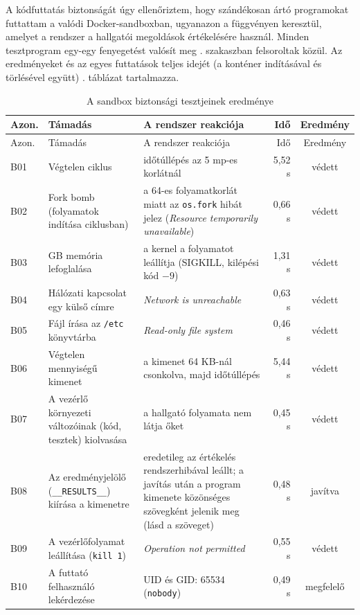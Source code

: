 A kódfuttatás biztonságát úgy ellenőriztem, hogy szándékosan ártó programokat futtattam a
valódi Docker-sandboxban, ugyanazon a függvényen keresztül, amelyet a rendszer a hallgatói
megoldások értékelésére használ. Minden tesztprogram egy-egy fenyegetést valósít meg
. szakaszban felsoroltak közül. Az eredményeket és az egyes futtatások
teljes idejét (a konténer indításával és törlésével együtt) . táblázat
tartalmazza.

{\small
\begin{longtable}{@{}l>{\raggedright\arraybackslash}p{3.9cm}>{\raggedright\arraybackslash}p{6.2cm}rc@{}}
  \caption{A sandbox biztonsági tesztjeinek eredménye}\label{tab:sandbox_tesztek}\\
  \toprule
  Azon. & Támadás & A rendszer reakciója & Idő & Eredmény \\
  \midrule
  \endfirsthead
  \toprule
  Azon. & Támadás & A rendszer reakciója & Idő & Eredmény \\
  \midrule
  \endhead
  \bottomrule
  \endfoot
  B01 & Végtelen ciklus & időtúllépés az 5 mp-es korlátnál & 5,52 s & védett \\
  B02 & Fork bomb (folyamatok indítása ciklusban) & a 64-es folyamatkorlát miatt az \texttt{os.fork} hibát jelez (\textit{Resource temporarily unavailable}) & 0,66 s & védett \\
  B03 & 1 GB memória lefoglalása & a kernel a folyamatot leállítja (SIGKILL, kilépési kód $-9$) & 1,31 s & védett \\
  B04 & Hálózati kapcsolat egy külső címre & \textit{Network is unreachable} & 0,63 s & védett \\
  B05 & Fájl írása az \texttt{/etc} könyvtárba & \textit{Read-only file system} & 0,46 s & védett \\
  B06 & Végtelen mennyiségű kimenet & a kimenet 64 KB-nál csonkolva, majd időtúllépés & 5,44 s & védett \\
  B07 & A vezérlő környezeti változóinak (kód, tesztek) kiolvasása & a hallgató folyamata nem látja őket & 0,45 s & védett \\
  B08 & Az eredményjelölő (\texttt{\_\_RESULTS\_\_}) kiírása a kimenetre & eredetileg az értékelés rendszerhibával leállt; a javítás után a program kimenete közönséges szövegként jelenik meg (lásd a szöveget) & 0,48 s & javítva \\
  B09 & A vezérlőfolyamat leállítása (\texttt{kill 1}) & \textit{Operation not permitted} & 0,55 s & védett \\
  B10 & A futtató felhasználó lekérdezése & UID és GID: 65534 (\texttt{nobody}) & 0,49 s & megfelelő \\
\end{longtable}
}

